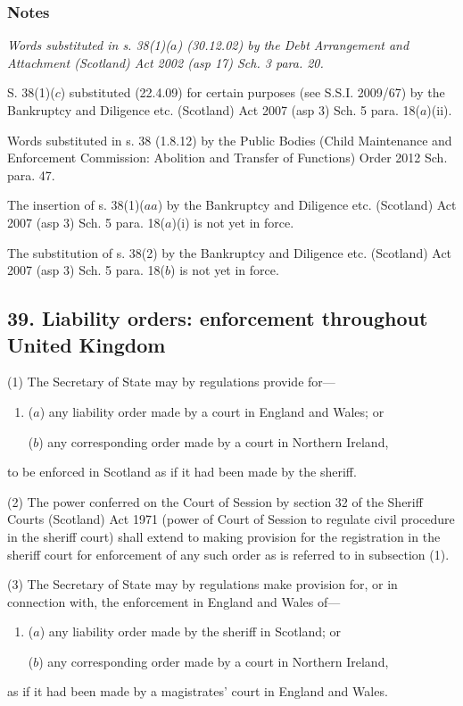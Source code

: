 \documentclass[a4paper]{article}
\newcommand\amendment[1]{\subsubsection*{Notes}{\itshape\frenchspacing\footnotesize #1 \par}}
\begin{document}
\amendment{
Words substituted in s. 38(1)($a$) (30.12.02) by the Debt Arrangement and Attachment (Scotland) Act 2002 (asp 17) Sch. 3 para. 20.

S. 38(1)($c$) substituted (22.4.09) for certain purposes (see S.S.I. 2009/67) by the Bankruptcy and Diligence etc. (Scotland) Act 2007 (asp 3) Sch. 5 para. 18($a$)(ii).

Words substituted in s. 38 (1.8.12) by the Public Bodies (Child Maintenance and Enforcement Commission: Abolition and Transfer of Functions) Order 2012 Sch. para. 47.

The insertion of s. 38(1)($aa$) by the Bankruptcy and Diligence etc. (Scotland) Act 2007 (asp 3) Sch. 5 para. 18($a$)(i) is not yet in force.

The substitution of s. 38(2) by the Bankruptcy and Diligence etc. (Scotland) Act 2007 (asp 3) Sch. 5 para. 18($b$) is not yet in force.

}

\subsection{39. Liability orders: enforcement throughout United Kingdom}

(1) The Secretary of State may by regulations provide for---
\begin{enumerate}\item[]
($a$) any liability order made by a court in England and Wales; or

($b$) any corresponding order made by a court in Northern Ireland,
\end{enumerate}
to be enforced in Scotland as if it had been made by the sheriff.

(2)
The power conferred on the Court of Session by section 32 of the Sheriff Courts (Scotland) Act 1971 (power of Court of Session to regulate civil procedure in the sheriff court) shall extend to making provision for the registration in the sheriff court for enforcement of any such order as is referred to in subsection (1).

(3)
The Secretary of State may by regulations make provision for, or in connection with, the enforcement in England and Wales of---
\begin{enumerate}\item[]
($a$) any liability order made by the sheriff in Scotland; or

($b$) any corresponding order made by a court in Northern Ireland,
\end{enumerate}
as if it had been made by a magistrates’ court in England and Wales.
\end{document}
